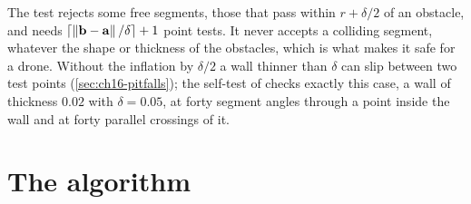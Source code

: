 The test rejects some free segments, those that pass within $r+\delta/2$ of
an obstacle, and needs $\lceil\left\lVert \mathbf{b}-\mathbf{a} \right\rVert/\delta\rceil+1$ point tests. It
never accepts a colliding segment, whatever the shape or thickness of the
obstacles, which is what makes it safe for a drone. Without the inflation by
$\delta/2$ a wall thinner than $\delta$ can slip between two test points
(\cref{sec:ch16-pitfalls}); the self-test of  checks
exactly this case, a wall of thickness $0.02$ with $\delta=0.05$, at forty
segment angles through a point inside the wall and at forty parallel
crossings of it.

\section{The algorithm}
\label{sec:ch16-algorithm}

\begin{algorithm}[htb]
\caption[\rrt with goal bias]{Rapidly-exploring random tree with goal bias \cite{lavalle1998rrt,lavalle2001randomized}}
\label{alg:ch16-rrt}
\end{algorithm}

